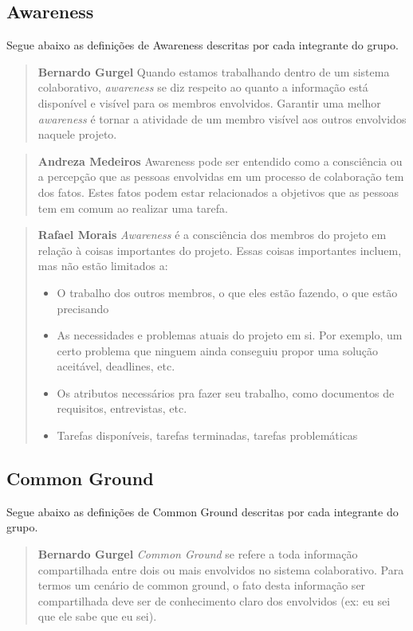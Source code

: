 \documentclass{acm_proc_article-sp}
\begin{document}
\subsection{Awareness}
Segue abaixo as definições de Awareness descritas por cada integrante do grupo.

\begin{quote}\textbf{Bernardo Gurgel}
Quando estamos trabalhando dentro de um sistema colaborativo, \textsl{awareness} se diz
respeito ao quanto a informação está disponível e visível para os membros envolvidos.
Garantir uma melhor \textsl{awareness} é tornar a atividade de um membro visível aos outros envolvidos naquele projeto.
\end{quote}

\begin{quote}\textbf{Andreza Medeiros}
Awareness pode ser entendido como a consciência ou a percepção que as pessoas envolvidas em um processo de colaboração tem dos fatos. Estes fatos podem estar relacionados a objetivos que as pessoas tem em comum ao realizar uma tarefa.
\end{quote}

\begin{quote}\textbf{Rafael Morais}
  \textsl{Awareness} é a consciência dos membros do projeto em relação à coisas importantes do projeto.
  Essas coisas importantes incluem, mas não estão limitados a:
  \begin{itemize}
    \item O trabalho dos outros membros, o que eles estão fazendo, o que estão precisando
    \item As necessidades e problemas atuais do projeto em si. Por exemplo, um certo problema
      que ninguem ainda conseguiu propor uma solução aceitável, deadlines, etc.
    \item Os atributos necessários pra fazer seu trabalho, como documentos de requisitos, entrevistas, etc.
    \item Tarefas disponíveis, tarefas terminadas, tarefas problemáticas
  \end{itemize}
\end{quote}

\subsection{Common Ground}
Segue abaixo as definições de Common Ground descritas por cada integrante do grupo.

\begin{quote}\textbf{Bernardo Gurgel}
  \textsl{Common Ground} se refere a toda informação compartilhada entre dois ou mais envolvidos no sistema colaborativo.
  Para termos um cenário de common ground, o fato desta informação ser compartilhada deve ser de conhecimento
  claro dos envolvidos (ex: eu sei que ele sabe que eu sei).
\end{quote}
\end{document}
